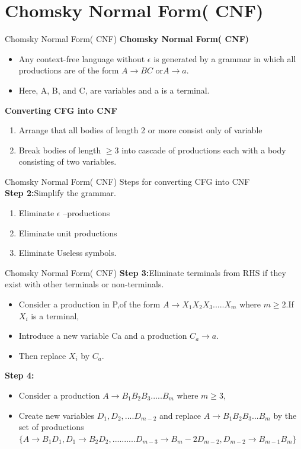 \documentclass{beamer}
\begin{document}
\section{Chomsky Normal Form( CNF)}
\begin{frame}{Chomsky Normal Form( CNF)}
\textbf{Chomsky Normal Form( CNF)}
\begin{itemize}
	\item Any context-free language without $\epsilon$ is generated by a grammar in which all 
	productions are of the form $ A\rightarrow BC$ or$ A\rightarrow  a$. \item Here, A, B, and C, are variables 
	and a is a terminal.
\end{itemize}
\textbf{Converting CFG into CNF}
\begin{enumerate}
	\item Arrange that all bodies of length 2 or more consist only of variable
	\item Break bodies of length $\geq 3$ into cascade of productions each with a body consisting of two variables.
\end{enumerate}
\end{frame}
\begin{frame}{Chomsky Normal Form( CNF)}
Steps for converting CFG into CNF\\
	\textbf{Step 2:}Simplify the grammar.
	\begin{enumerate}[a]
		\item Eliminate $\epsilon$ –productions
		\item Eliminate unit productions
		\item Eliminate Useless symbols.
	\end{enumerate}
\end{frame}
\begin{frame}{Chomsky Normal Form( CNF)}
	\textbf{Step 3:}Eliminate terminals from RHS if they exist with other terminals or non-terminals.
	\begin{itemize}
		\item Consider a production in P,of the form $A\rightarrow X_1X_2X_3.....X_m$ where 
		$m\geq2$.If $X_i$ is a terminal,
		\item Introduce a new variable Ca and a production $C_a\rightarrow a$.
		\item Then replace $X_i$ by $C_a$. 
	\end{itemize}
	\textbf{Step 4:}
\begin{itemize}
	\item Consider a production $A\rightarrow B_1B_2B_3.....B_m$ where $m\geq3$,
	\item Create new 
	variables $D_1,D_2,....D_{m-2}$ and replace $A\rightarrow B_1B_2B_3...B_m$ by the set of productions 
	$\{A\rightarrow B_1D_1,D_1\rightarrow B_2D_2,..........D_{m-3}\rightarrow B_m-2 D_{m-2},D_{m-2}\rightarrow B_{m-1}B_m \}$
	
\end{itemize}
\end{frame}
\end{document}
